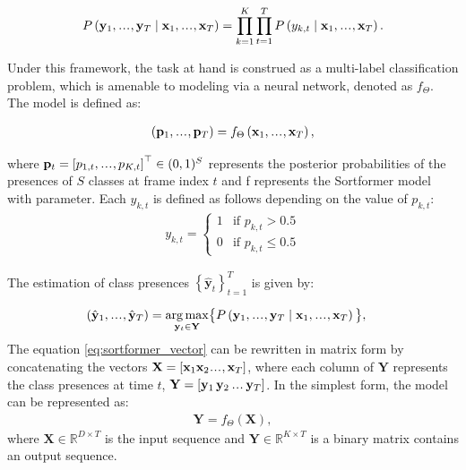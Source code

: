\documentclass{article}
\newcommand\sdots{\makebox[1em][c]{.\hfil.\hfil.}}
\begin{document}
\begin{align}
  P\left(\mathbf{y}_1, \sdots, \mathbf{y}_T \mid \mathbf{x}_1, \sdots, \mathbf{x}_T\right) = \prod_{k=1}^K\prod_{t=1}^T  P\left(y_{k, t} \mid \mathbf{x}_1, \sdots, \mathbf{x}_T\right).
\end{align}

Under this framework, the task at hand is construed as a multi-label classification problem, which is amenable to modeling via a neural network, denoted as  $f_{\Theta}$. The model is defined as:

\begin{align}
  \left(\mathbf{p}_1, \sdots, \mathbf{p}_T\right) = f_{\Theta}\left(\mathbf{x}_1, \sdots, \mathbf{x}_T\right),
\end{align}

where \( \mathbf{p}_t = \left[p_{1, t}, \sdots, p_{K, t}\right]^{\top} \in (0,1)^S \) represents the posterior probabilities of the presences of \( S \) classes at frame index \( t \) and f represents
the Sortformer model with parameter.
Each \( y_{k, t} \) is defined as follows depending on the value of \( p_{k, t} \):
\begin{align}
  y_{k,t} =
  \begin{cases}
    1 & \text{if } p_{k,t} > 0.5    \\
    0 & \text{if } p_{k,t} \leq 0.5
  \end{cases}
\end{align}

The estimation of class presences $\left\{\hat{\mathbf{y}}_t\right\}_{t=1}^T$ is given by:

\begin{align}
  (\hat{\mathbf{y}}_1, \sdots, \hat{\mathbf{y}}_T) & = \underset{\mathbf{y}_t \in \mathbf{Y}}{\arg\max} \big\{ P\left(\mathbf{y}_1, \sdots, \mathbf{y}_T \mid \mathbf{x}_1, \sdots, \mathbf{x}_T\right) \big\},
  \label{eq:sortformer_vector}
\end{align}
The equation \ref{eq:sortformer_vector} can be rewritten in matrix form by concatenating the vectors $ \mathbf{X} = [ \mathbf{x}_1 \mathbf{x}_2 \sdots, \mathbf{x}_T ] $,
where each column of $\mathbf{Y}$ represents the class presences at time $t$, $ \mathbf{Y} = [\mathbf{y}_1 \, \mathbf{y}_2 \, \sdots \, \mathbf{y}_T]$.
In the simplest form, the model can be represented as:
\begin{align}
  \mathbf{Y} = f_{\Theta}\left(\mathbf{X}\right),
\end{align}
where \( \mathbf{X} \in \mathbb{R}^{D \times T} \) is the input sequence and \( \mathbf{Y} \in \mathbb{R}^{K \times T} \) is a binary matrix contains an output sequence.
\end{document}
